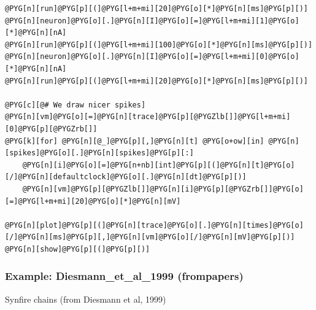 \documentclass[letterpaper,10pt,english]{manual}
\begin{document}
\begin{Verbatim}[commandchars=@\[\]]
@PYG[n][run]@PYG[p][(]@PYG[l+m+mi][20]@PYG[o][*]@PYG[n][ms]@PYG[p][)]
@PYG[n][neuron]@PYG[o][.]@PYG[n][I]@PYG[o][=]@PYG[l+m+mi][1]@PYG[o][*]@PYG[n][nA]
@PYG[n][run]@PYG[p][(]@PYG[l+m+mi][100]@PYG[o][*]@PYG[n][ms]@PYG[p][)]
@PYG[n][neuron]@PYG[o][.]@PYG[n][I]@PYG[o][=]@PYG[l+m+mi][0]@PYG[o][*]@PYG[n][nA]
@PYG[n][run]@PYG[p][(]@PYG[l+m+mi][20]@PYG[o][*]@PYG[n][ms]@PYG[p][)]

@PYG[c][@# We draw nicer spikes]
@PYG[n][vm]@PYG[o][=]@PYG[n][trace]@PYG[p][@PYGZlb[]]@PYG[l+m+mi][0]@PYG[p][@PYGZrb[]]
@PYG[k][for] @PYG[n][@_]@PYG[p][,]@PYG[n][t] @PYG[o+ow][in] @PYG[n][spikes]@PYG[o][.]@PYG[n][spikes]@PYG[p][:]
    @PYG[n][i]@PYG[o][=]@PYG[n+nb][int]@PYG[p][(]@PYG[n][t]@PYG[o][/]@PYG[n][defaultclock]@PYG[o][.]@PYG[n][dt]@PYG[p][)]
    @PYG[n][vm]@PYG[p][@PYGZlb[]]@PYG[n][i]@PYG[p][@PYGZrb[]]@PYG[o][=]@PYG[l+m+mi][20]@PYG[o][*]@PYG[n][mV]

@PYG[n][plot]@PYG[p][(]@PYG[n][trace]@PYG[o][.]@PYG[n][times]@PYG[o][/]@PYG[n][ms]@PYG[p][,]@PYG[n][vm]@PYG[o][/]@PYG[n][mV]@PYG[p][)]
@PYG[n][show]@PYG[p][(]@PYG[p][)]
\end{Verbatim}

\resetcurrentobjects
\hypertarget{--doc-examples-frompapers_Diesmann_et_al_1999}{}

\hypertarget{index-28}{}\subsubsection{Example: Diesmann\_et\_al\_1999 (frompapers)}

Synfire chains (from Diesmann et al, 1999)
\end{document}
